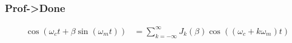 \documentclass[11pt,aspectratio=169]{beamer}
\begin{document}
\begin{frame}
		\frametitle{Prof->Done}
		\begin{align}
			\cos(\omega_ct+\beta\sin(\omega_mt))
			&=
			\sum_{k= -\infty}^\infty J_{k}(\beta) \cos((\omega_c+k\omega_m)t)
		\end{align}
	\end{frame}
	\begin{frame}
	\begin{figure}
	\end{figure}
	\end{frame}
\end{document}
